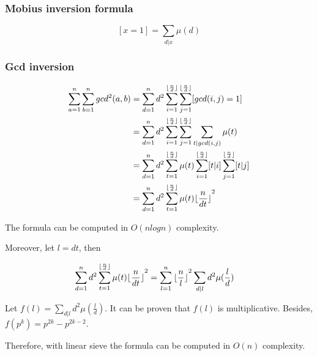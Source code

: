 \subsubsection{Mobius inversion formula}

$$[x = 1] = \sum_{d|x}\mu(d)$$

\subsubsection{Gcd inversion}
\begin{align*}
\sum_{a=1}^n\sum_{b=1}^ngcd^2(a,b)&=\sum_{d=1}^nd^2\sum_{i=1}^{\lfloor\frac{n}{d}\rfloor}\sum_{j=1}^{\lfloor\frac{n}{d}\rfloor}[gcd(i,j)=1]\\
&=\sum_{d=1}^nd^2\sum_{i=1}^{\lfloor\frac{n}{d}\rfloor}\sum_{j=1}^{\lfloor\frac{n}{d}\rfloor}\sum_{t|gcd(i,j)}\mu(t)\\
&=\sum_{d=1}^nd^2\sum_{t=1}^{\lfloor\frac{n}{d}\rfloor}\mu(t)\sum_{i=1}^{\lfloor\frac{n}{d}\rfloor}[t|i]\sum_{j=1}^{\lfloor\frac{n}{d}\rfloor}[t|j]\\
&=\sum_{d=1}^nd^2\sum_{t=1}^{\lfloor\frac{n}{d}\rfloor}\mu(t){\lfloor\frac{n}{dt}\rfloor}^2
\end{align*}

The formula can be computed in $O(nlogn)$ complexity.

Moreover, let $l=dt$, then

\begin{align*}
\sum_{d=1}^nd^2\sum_{t=1}^{\lfloor\frac{n}{d}\rfloor}\mu(t){\lfloor\frac{n}{dt}\rfloor}^2&=\sum_{l=1}^n{\lfloor\frac{n}{l}\rfloor}^2\sum_{d|l}d^2\mu(\frac{l}{d})
\end{align*}

Let $f(l)=\sum_{d|l}d^2\mu(\frac{l}{d})$. It can be proven that $f(l)$ is multiplicative. Besides, $f(p^k)=p^{2k}-p^{2k-2}$.

Therefore, with linear sieve the formula can be computed in $O(n)$ complexity.

